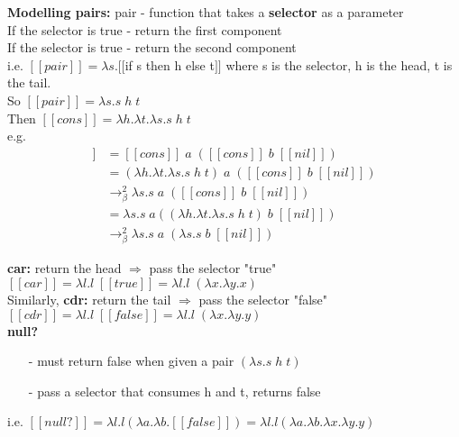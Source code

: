 \documentclass[11pt]{article}
\begin{document}
{\bf Modelling pairs:} pair - function that takes a {\bf selector} as a parameter \\

If the selector is true - return the first component \\

If the selector is true - return the second component \\

i.e. $[[pair]] = \lambda s.[[$if s then h else t$]]$ where s is the selector, h is the head, t is the tail. \\

So $[[pair]] = \lambda s.s\;h\;t$ \\

Then $[[cons]] = \lambda h.\lambda t.\lambda s.s\;h\;t$ \\

e.g. 
\begin{align*}
[[\text{cons a (cons b nil)}]] &= [[cons]]\;a\;([[cons]]\;b\;[[nil]]) \\
&= (\lambda h.\lambda t.\lambda s.s\;h\;t)\;a\;([[cons]]\;b\;[[nil]]) \\
&\rightarrow_\beta^2 \lambda s.s\;a\;([[cons]]\;b\;[[nil]]) \\
&= \lambda s.s\;a((\lambda h.\lambda t.\lambda s.s\;h\;t)\;b\;[[nil]]) \\
&\rightarrow_\beta^2 \lambda s.s\;a\;(\lambda s.s\;b\;[[nil]]) 
\end{align*}

{\bf car:} return the head $\Rightarrow$ pass the selector "true" \\

$[[car]] = \lambda l.l\;[[true]] = \lambda l.l\;(\lambda x.\lambda y.x)$ \\

Similarly, {\bf cdr:} return the tail $\Rightarrow$ pass the selector "false" \\

$[[cdr]] = \lambda l.l\;[[false]] = \lambda l.l\;(\lambda x.\lambda y.y)$ \\

{\bf null?}
\begin{itemize}
	\item[-] must return false when given a pair $(\lambda s.s\;h\;t)$
	\item[-] pass a selector that consumes h and t, returns false
\end{itemize}

i.e. $[[null?]] = \lambda l.l(\lambda a.\lambda b.[[false]]) = \lambda l.l(\lambda a.\lambda b.\lambda x.\lambda y.y)$ \\
\end{document}
